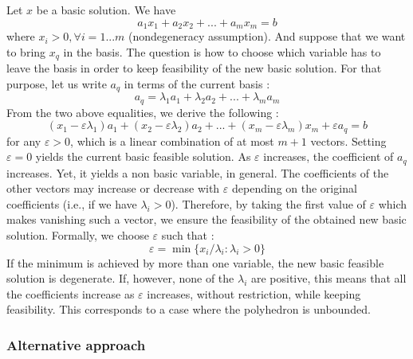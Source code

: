 Let $x$ be a basic solution. We have \[ a_1x_1 + a_2x_2 + ... + a_mx_m = b \] where $x_i>0, \forall i = 1...m$ (nondegeneracy assumption). And suppose that we want to bring $x_q$ in the basis. The question is how to choose which variable has to leave the basis in order to keep feasibility of the new basic solution. For that purpose, let us write $a_q$ in terms of the current basis : \[ a_q = \lambda_1 a_1 + \lambda_2 a_2 + ... + \lambda_m a_m \] From the two above equalities, we derive the following : {\small \[ (x_1 - \varepsilon \lambda_1)a_1 + (x_2 - \varepsilon\lambda_2)a_2 + ... + (x_m - \varepsilon\lambda_m)x_m + \varepsilon a_q = b \]} for any $\varepsilon > 0$, which is a linear combination of at most $m+1$ vectors. Setting $\varepsilon = 0$ yields the current basic feasible solution. As $\varepsilon$ increases, the coefficient of $a_q$ increases. Yet, it yields a non basic variable, in general. The coefficients of the other vectors may increase or decrease with $\varepsilon$ depending on the original coefficients (i.e., if we have $\lambda_i > 0$). Therefore, by taking the first value of $\varepsilon$ which makes vanishing such a vector, we ensure the feasibility of the obtained new basic solution. Formally, we choose $\varepsilon$ such that : 
\[ \varepsilon = \min\{ x_i/\lambda_i : \lambda_i > 0 \} \] If the minimum is achieved by more than one variable, the new basic feasible solution is degenerate. If, however, none of the $\lambda_i$ are positive, this means that all the coefficients increase as $\varepsilon$ increases, without restriction, while keeping feasibility. This corresponds to a case where the polyhedron is unbounded. 

\subsubsection{Alternative approach}

